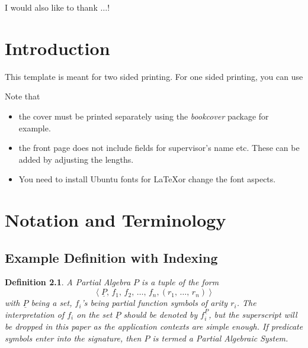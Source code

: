 \documentclass[a4paper,11pt,twoside,chapterprefix=TRUE]{scrbook}
\newtheorem{definition}{Definition}[chapter]
\begin{document}
{\large \fontUbuntu I would also like to thank $\ldots$!}


\tableofcontents

\listoftables
\listoffigures

\mainmatter

\chapter{Introduction}


This template is meant for two sided printing. For one sided printing, you can use 

Note that 
\begin{itemize}
\item {the cover must be printed separately using the \emph{bookcover} package for example.}
\item {the front page does not include fields for supervisor's name etc. These can be added by adjusting the lengths. }
\item {You need to install Ubuntu fonts for \LaTeX or change the font aspects. }
\end{itemize}



\chapter{Notation and Terminology}





\section{Example Definition with Indexing}\label{palg}

\begin{definition}
A \emph{Partial Algebra} $P$ is a tuple of the form \[\left\langle\underline{P},\,f_{1},\,f_{2},\,\ldots ,\, f_{n}, (r_{1},\,\ldots ,\,r_{n} )\right\rangle\] with $\underline{P}$ being a set, $f_{i}$'s being partial function symbols of arity $r_{i}$. The interpretation of $f_{i}$ on the set $\underline{P}$ should be denoted by $f_{i}^{\underline{P}}$, but the superscript will be dropped in this paper as the application contexts are simple enough. If predicate symbols enter into the signature, then $P$ is termed a \emph{Partial Algebraic System}.   
\end{definition}
\end{document}
